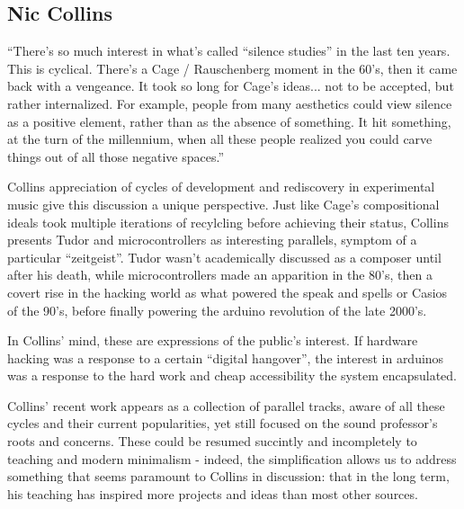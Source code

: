 


\subsection{Nic Collins}

``There’s so much interest in what’s called ``silence studies'' in the last ten years. This is cyclical. There’s a Cage / Rauschenberg moment in the 60’s, then it came back with a vengeance. It took so long for Cage’s ideas... not to be accepted, but rather internalized. For example, people from many aesthetics could view silence as a positive element, rather than as the absence of something. It hit something, at the turn of the millennium, when all these people realized you could carve things out of all those negative spaces.''

Collins appreciation of cycles of development and rediscovery in experimental music give this discussion a unique perspective. Just like Cage's compositional ideals took multiple iterations of recylcling before achieving their status, Collins presents Tudor and microcontrollers as interesting parallels, symptom of a particular ``zeitgeist''. Tudor wasn't academically discussed as a composer until after his death, while microcontrollers made an apparition in the 80's, then a covert rise in the hacking world as what powered the speak and spells or Casios of the 90's, before finally powering the arduino revolution of the late 2000's.

In Collins' mind, these are expressions of the public's interest. If hardware hacking was a response to a certain ``digital hangover'', the interest in arduinos was a response to the hard work and cheap accessibility the system encapsulated. 

Collins' recent work appears as a collection of parallel tracks, aware of all these cycles and their current popularities, yet still focused on the sound professor's roots and concerns. These could be resumed succintly and incompletely to teaching and modern minimalism - indeed, the simplification allows us to address something that seems paramount to Collins in discussion: that in the long term, his teaching has inspired more projects and ideas than most other sources. 


